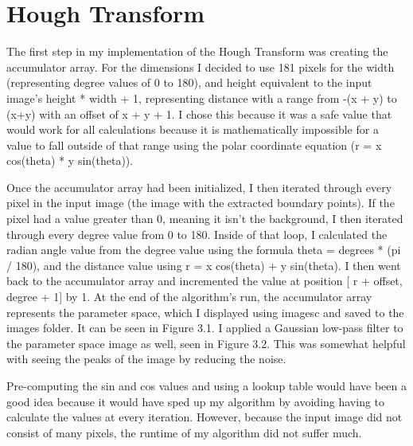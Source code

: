\documentclass[paper=a4, fontsize=11pt]{scrartcl} %
\numberwithin{equation}{section} %
\numberwithin{figure}{section} %
\numberwithin{table}{section} %
\begin{document}
\section{Hough Transform}

The first step in my implementation of the Hough Transform was creating the accumulator array. For the dimensions I decided to use 181 pixels for the width (representing degree values of 0 to 180), and height equivalent to the input image's height * width + 1, representing distance with a range from -(x + y) to (x+y) with an offset of x + y + 1. I chose this because it was a safe value that would work for all calculations because it is mathematically impossible for a value to fall outside of that range using the polar coordinate equation (r = x cos(theta) * y sin(theta)).

Once the accumulator array had been initialized, I then iterated through every pixel in the input image (the image with the extracted boundary points). If the pixel had a value greater than 0, meaning it isn't the background, I then iterated through every degree value from 0 to 180. Inside of that loop, I calculated the radian angle value from the degree value using the formula theta = degrees * (pi / 180), and the distance value using r = x cos(theta) + y sin(theta). I then went back to the accumulator array and incremented the value at position [ r + offset, degree + 1] by 1. At the end of the algorithm's run, the accumulator array represents the parameter space, which I displayed using imagesc and saved to the images folder. It can be seen in Figure 3.1. I applied a Gaussian low-pass filter to the parameter space image as well, seen in Figure 3.2. This was somewhat helpful with seeing the peaks of the image by reducing the noise.

Pre-computing the sin and cos values and using a lookup table would have been a good idea because it would have sped up my algorithm by avoiding having to calculate the values at every iteration. However, because the input image did not consist of many pixels, the runtime of my algorithm did not suffer much.
\end{document}
